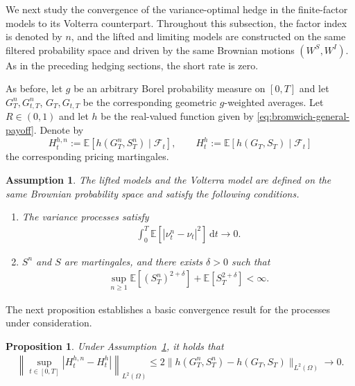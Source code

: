 \documentclass[10pt,a4paper,reqno]{amsart}
\theoremstyle{plain}
\newtheorem{proposition}[theorem]{Proposition}
\newtheorem{assumption}[theorem]{Assumption}
\theoremstyle{definition}
\theoremstyle{remark}
\theoremstyle{example}
\begin{document}
We next study the convergence of the variance-optimal hedge in the
finite-factor models to its Volterra counterpart. Throughout this
subsection, the factor index is denoted by $n$, and the lifted and
limiting models are constructed on the same filtered probability space
and driven by the same Brownian motions $(W^S,W^I)$. As in the preceding
hedging sections, the short rate is zero.

As before, let $g$ be an arbitrary Borel probability measure on $[0,T]$ and let $G_T^n, G_{t,T}^n$, $G_T, G_{t,T}$ be the corresponding geometric $g$-weighted averages. Let $R\in(0,1)$ and let $h$ be the real-valued function given by \eqref{eq:bromwich-general-payoff}. Denote by 
\[
    H_t^{h,n} := \mathbb E[ h(G_T^n, S_T^n) \mid\mathcal F_t],
    \qquad
    H_t^h := \mathbb E[ h(G_T, S_T) \mid\mathcal F_t]
\]
the corresponding pricing martingales.  

\begin{assumption}\label{assump:strong-lift-convergence}
The lifted models and the Volterra model are defined on the same
Brownian probability space and satisfy the following conditions.
\begin{enumerate}
    \item[(i)] The variance processes satisfy
    \begin{align}\label{eq:strong-variance-convergence}
        \int_0^T \mathbb E[ |\nu_t^n-\nu_t|^2 ]\,\mathrm dt \longrightarrow0.
    \end{align}

    \item[(ii)] $S^n$ and $S$ are martingales, and there exists $\delta>0$ such that
    \begin{align}\label{eq:uniform-stock-moments-lift}
        \sup_{n\geq1} \mathbb E[ (S_T^n)^{2+\delta} ] + \mathbb E[ S_T^{2+\delta} ] <\infty.
    \end{align}
\end{enumerate}
\end{assumption}

The next proposition establishes a basic convergence result for the processes under consideration.

\begin{proposition}\label{prop:lifted-payoff-L2-convergence}
Under Assumption~\ref{assump:strong-lift-convergence}, it holds that
\begin{align}\label{eq:price-process-lifted-convergence}
    \left\| \sup_{t\in[0,T]} |H_t^{h,n}-H_t^h| \right\|_{L^2(\Omega)} \leq 2\|h(G_T^n, S_T^n) - h(G_T, S_T)\|_{L^2(\Omega)} \longrightarrow 0.
\end{align}
\end{proposition}
\end{document}
